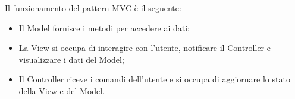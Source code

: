         Il funzionamento del pattern MVC è il seguente:
        \begin{itemize}
            \item Il Model fornisce i metodi per accedere ai dati;
            \item La View si occupa di interagire con l'utente, notificare il Controller e visualizzare i dati del Model;
            \item Il Controller riceve i comandi dell'utente e si occupa di aggiornare lo stato della View e del Model.
        \end{itemize}